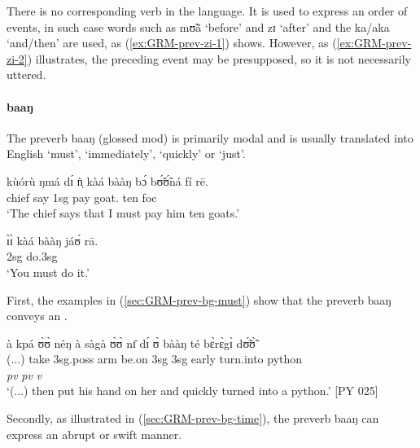 \begin{exe}
\begin{exe}
\begin{exe}
\begin{exe}
\begin{exe}
\begin{exe}
\begin{exe}
\begin{exe}
\begin{exe}
\begin{exe}
\begin{exe}
\begin{exe}
\z 
 \z


There is no corresponding verb in the language.   It is used to express an 
order of events,  in such case words such as {\sls mʊ̃ã}  `before' and {\sls 
zɪ} `after' and the  {\sls ka/aka}  `and/then' are used, as 
(\ref{ex:GRM-prev-zi-1}) shows. However,  as (\ref{ex:GRM-prev-zi-2}) 
illustrates,  the preceding event may be presupposed, so  it is not necessarily 
uttered.







\paragraph{baaŋ}
\label{sec:GRM-preverb-baang}

 The preverb  {\sls baaŋ}  (glossed {\sc mod})  is primarily  modal and is  
usually translated into English `must', `immediately', `quickly'  or `just'. 


\ea\label{sec:GRM-prev-bg-must}
\ea\label{ex:GRM-7.17}
\gll  kùórù ŋmá dɪ́ ǹ̩ kàá bààŋ bɔ́ bʊ̃́ʊ̃́ná  fí rē.\\
 chief say {\comp} {\sc 1sg} {\fut} {\mod}   pay  goat.{\pl} ten {\sc foc}\\
\glt  `The chief says that I must pay him ten goats.' 

\ex\label{ex:GRM-14.3}
\gll  ɪ̀ɪ̀ kàá bààŋ jáʊ́ rā.\\
{\sc 2sg} {\fut} {\mod} do.{\sc 3sg} {\foc}\\
\glt  `You must do it.'

 \z 
 \z
 
First, the examples in (\ref{sec:GRM-prev-bg-must}) show that  the preverb  
{\sls baaŋ} conveys an .


\ea\label{sec:GRM-prev-bg-time}
 à kpá ʊ̀ʊ̀ néŋ à sàgà ʊ̀ʊ̀ nɪ̄ dɪ́ ʊ̀ bààŋ té 
bɛ̀rɛ̀gɪ̀ dʊ̃́ʊ̃̀\\
  {(...})  {\conn}  take {\sc 3sg.poss} arm {\conn} {be.on} {\sc
3sg}  {\postp} {\conn} {\sc 3sg} {\mod} {early} turn.into python\\
{} {} {} {} {} {} {} {} {} {} {} {\it pv} {\it pv} {\it v} {}\\

\glt  `(...) then put his hand on her  and quickly turned into
a python.' [PY 025]
\z
   
   Secondly, as illustrated in (\ref{sec:GRM-prev-bg-time}),  the preverb  
{\sls baaŋ} can express an  abrupt or
swift   manner. 


\end{exe}
\end{exe}
\end{exe}
\end{exe}
\end{exe}
\end{exe}
\end{exe}
\end{exe}
\end{exe}
\end{exe}
\end{exe}
\end{exe}
